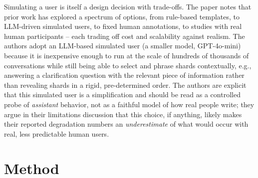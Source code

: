 \documentclass[manuscript,review]{acmart}
\begin{document}
Simulating a user is itself a design decision with trade-offs. The paper notes that prior work has explored
a spectrum of options, from rule-based templates, to LLM-driven simulated users, to fixed human annotations,
to studies with real human participants -- each trading off cost and scalability against realism. The
authors adopt an LLM-based simulated user (a smaller model, GPT-4o-mini) because it is inexpensive enough
to run at the scale of hundreds of thousands of conversations while still being able to select and phrase
shards contextually, e.g., answering a clarification question with the relevant piece of information rather
than revealing shards in a rigid, pre-determined order. The authors are explicit that this simulated user
is a simplification and should be read as a controlled probe of \emph{assistant} behavior, not as a
faithful model of how real people write; they argue in their limitations discussion that this choice, if
anything, likely makes their reported degradation numbers an \emph{underestimate} of what would occur with
real, less predictable human users.


 
\section{Method}
 
\end{document}
